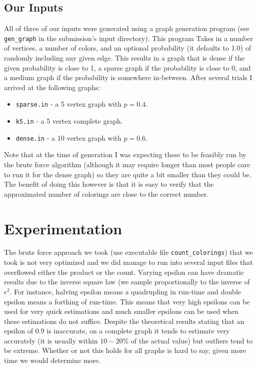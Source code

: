 \documentclass[14]{article}
\begin{document}
\subsection{Our Inputs}
All of three of our inputs were generated using a graph generation program (see \texttt{gen\_graph} in the submission's input directory). This program Takes in a number of vertices, a number of colors, and an optional probability (it defaults to 1.0) of randomly including any given edge. This results in a graph that is dense if the given probability is close to 1, a sparse graph if the probability is close to 0, and a medium graph if the probability is somewhere in-between. After several trials I arrived at the following graphs:
\begin{itemize}
\item \texttt{sparse.in} - a 5 vertex graph with $p=0.4$.
\item \texttt{k5.in} - a 5 vertex complete graph.
\item \texttt{dense.in} - a 10 vertex graph with $p=0.6$.
\end{itemize}
Note that at the time of generation I was expecting these to be feasibly run by the brute force algorithm (although it may require longer than most people care to run it for the dense graph) so they are quite a bit smaller than they could be. The benefit of doing this however is that it is easy to verify that the approximated number of colorings are close to the correct number.
\section{Experimentation}
The brute force approach we took (use executable file \texttt{count\_colorings}) that we took is not very optimized and we did manage to run into several input files that overflowed either the product or the count.
Varying epsilon can have dramatic results due to the inverse square law (we sample proportionally to the inverse of $\epsilon^2$. For instance, halving epsilon means a quadrupling in run-time and double epsilon means a forthing of run-time. This means that very high epsilons can be used for very quick estimations and much smaller epsilons can be used when these estimations do not suffice. Despite the theoretical results stating that an epsilon of 0.9 is inaccurate, on a complete graph it tends to estimate very accurately (it is usually within $10-20\%$ of the actual value) but outliers tend to be extreme. Whether or not this holds for all graphs is hard to say, given more time we would determine more.
\end{document}
